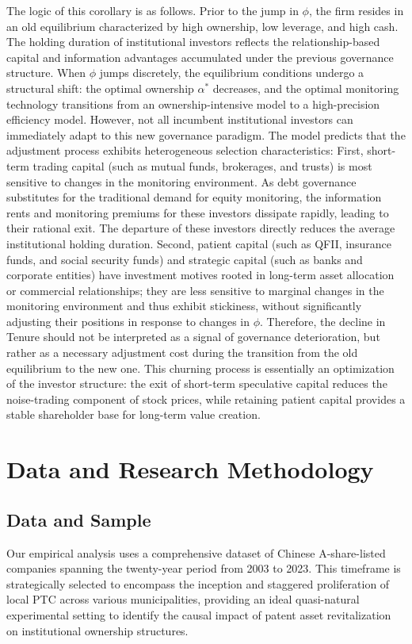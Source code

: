 \documentclass[12pt,a4paper]{article}
\begin{document}
The logic of this corollary is as follows. Prior to the jump in $\phi$, the firm resides in an old equilibrium characterized by high ownership, low leverage, and high cash. The holding duration of institutional investors reflects the relationship-based capital and information advantages accumulated under the previous governance structure. When $\phi$ jumps discretely, the equilibrium conditions undergo a structural shift: the optimal ownership $\alpha^*$ decreases, and the optimal monitoring technology transitions from an ownership-intensive model to a high-precision efficiency model. However, not all incumbent institutional investors can immediately adapt to this new governance paradigm. The model predicts that the adjustment process exhibits heterogeneous selection characteristics: First, short-term trading capital (such as mutual funds, brokerages, and trusts) is most sensitive to changes in the monitoring environment. As debt governance substitutes for the traditional demand for equity monitoring, the information rents and monitoring premiums for these investors dissipate rapidly, leading to their rational exit. The departure of these investors directly reduces the average institutional holding duration. Second, patient capital (such as QFII, insurance funds, and social security funds) and strategic capital (such as banks and corporate entities) have investment motives rooted in long-term asset allocation or commercial relationships; they are less sensitive to marginal changes in the monitoring environment and thus exhibit stickiness, without significantly adjusting their positions in response to changes in $\phi$. Therefore, the decline in Tenure should not be interpreted as a signal of governance deterioration, but rather as a necessary adjustment cost during the transition from the old equilibrium to the new one. This churning process is essentially an optimization of the investor structure: the exit of short-term speculative capital reduces the noise-trading component of stock prices, while retaining patient capital provides a stable shareholder base for long-term value creation.

\section{Data and Research Methodology}\label{sec4}
\subsection{Data and Sample}
Our empirical analysis uses a comprehensive dataset of Chinese A-share-listed companies spanning the twenty-year period from 2003 to 2023. This timeframe is strategically selected to encompass the inception and staggered proliferation of local PTC across various municipalities, providing an ideal quasi-natural experimental setting to identify the causal impact of patent asset revitalization on institutional ownership structures.
\end{document}
